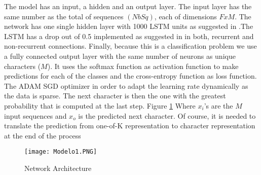 The model has an input, a hidden and an output layer. The input layer has the same number as the total of sequences $(NbSq)$, each of dimensions $FxM$. The network has one single hidden layer with 1000 LSTM units as suggested in \cite{graves2013generating}.The LSTM has a drop out of 0.5 implemented as suggested in \cite{gal2015theoretically} in both, recurrent and non-recurrent connections. Finally, because this is a classification problem we use a fully connected output layer with the same number of neurons as unique characters ($M$). It uses the softmax function as activation function to make predictions for each of the classes and the cross-entropy function as loss function. The ADAM SGD optimizer in order to adapt the learning rate dynamically as the data is sparse. The next character is then the one with the greatest probability that is computed at the last step. Figure \ref{fig:netarch}  Where $x_{i}$'s are the $M$ input sequences and $x_o$ is the predicted next character. Of course, it is needed to translate the prediction from one-of-K representation to character representation at the end of the process

\begin{figure}[h]
\centering
\texttt{[image: Modelo1.PNG]}
\caption{Network Architecture}
\label{fig:netarch}
\end{figure}























